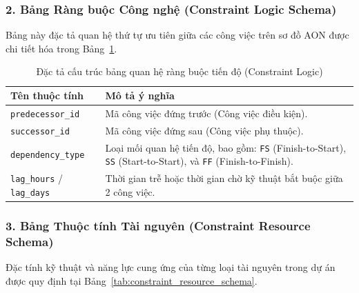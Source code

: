 \subsubsection{2. Bảng Ràng buộc Công nghệ (Constraint Logic Schema)}
Bảng này đặc tả quan hệ thứ tự ưu tiên giữa các công việc trên sơ đồ AON được chi tiết hóa trong Bảng~\ref{tab:constraint_logic_schema}.

\begin{table}[H]
\centering
\caption{Đặc tả cấu trúc bảng quan hệ ràng buộc tiến độ (Constraint Logic)}
\label{tab:constraint_logic_schema}
\begin{tabular}{|p{4.5cm}|p{10.5cm}|}
\hline
\textbf{Tên thuộc tính} & \textbf{Mô tả ý nghĩa} \\ \hline
\texttt{predecessor\_id} & Mã công việc đứng trước (Công việc điều kiện). \\ \hline
\texttt{successor\_id} & Mã công việc đứng sau (Công việc phụ thuộc). \\ \hline
\texttt{dependency\_type} & Loại mối quan hệ tiến độ, bao gồm: \texttt{FS} (Finish-to-Start), \texttt{SS} (Start-to-Start), và \texttt{FF} (Finish-to-Finish). \\ \hline
\texttt{lag\_hours} / \texttt{lag\_days} & Thời gian trễ hoặc thời gian chờ kỹ thuật bắt buộc giữa 2 công việc. \\ \hline
\end{tabular}
\end{table}

\subsubsection{3. Bảng Thuộc tính Tài nguyên (Constraint Resource Schema)}
Đặc tính kỹ thuật và năng lực cung ứng của từng loại tài nguyên trong dự án được quy định tại Bảng~\ref{tab:constraint_resource_schema}.

